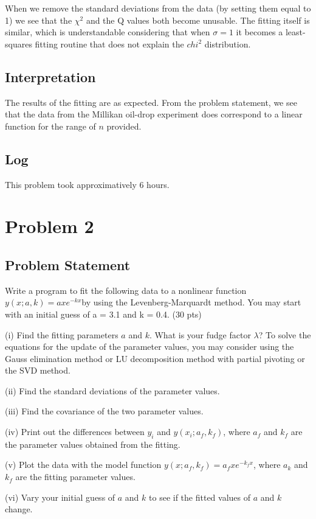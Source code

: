 \documentclass[10pt,letter]{article}
\begin{document}
When we remove the standard deviations from the data (by setting them equal to 1) we see that the $\chi^2$ and the Q values both become unusable. The fitting itself is similar, which is understandable considering that when $\sigma = 1$ it becomes a least-squares fitting routine that does not explain the $chi^2$ distribution.

\subsection{Interpretation}
The results of the fitting are as expected. From the problem statement, we see that the data from the Millikan oil-drop experiment does correspond to a linear function for the range of $n$ provided.

\subsection{Log}
This problem took approximatively 6 hours.

\section{Problem 2}

\subsection{Problem Statement}
Write a program to fit the following data to a nonlinear function
$y(x; a , k ) = a x e^{-k x} $by using the Levenberg-Marquardt method. You may start with an initial
guess of a = 3.1 and k = 0.4. (30 pts)

(i) Find the fitting parameters $a$ and $k$. What is your fudge factor $\lambda$? To solve the equations for
the update of the parameter values, you may consider using the Gauss elimination method or LU
decomposition method with partial pivoting or the SVD method.

(ii) Find the standard deviations
of the parameter values. 

(iii) Find the covariance of the two parameter values. 

(iv) Print out the
differences between $y_i$ and $y(x_i ; a_f , k_f )$, where $a_f$ and $k_f$ are the parameter values obtained from
the fitting. 

(v) Plot the data with the model function $y(x; a_f , k_f ) = a_f x e^{-k_f x}$, where $a_k$ and
$k_f$ are the fitting parameter values. 

(vi) Vary your initial guess of $a$ and $k$ to see if the fitted values
of $a$ and $k$ change. 
\end{document}
